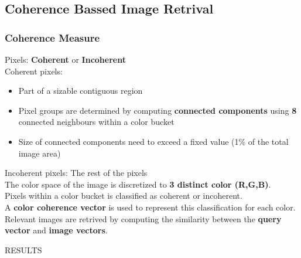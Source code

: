 \documentclass[9pt]{beamer}
\begin{document}
\subsection{Coherence Bassed Image Retrival}
\begin{frame}
\frametitle{Coherence Measure}
Pixels: \textbf{Coherent} or \textbf{Incoherent}\\[\baselineskip]
\pause
Coherent pixels:\\
\pause
\begin{itemize}[label=$\star$]
\item Part of a sizable contiguous region
\pause
\item Pixel groups are determined by computing \textbf{connected components} using \textbf{8} connected neighbours within a color bucket
\pause
\item Size of connected components need to exceed a fixed value (1\% of the total image area)\\[\baselineskip]
\pause
\end{itemize}
Incoherent pixels: The rest of the pixels\\[\baselineskip]
\pause
The color space of the image is discretized to \textbf{3 distinct color (R,G,B)}.\\[\baselineskip]
\pause
Pixels within a color bucket is classified as coherent or incoherent.\\[\baselineskip]
\pause
A \textbf{color coherence vector} is used to represent this classification for each color.\\[\baselineskip]
\pause
Relevant images are retrived by computing the similarity between the \textbf{query vector} and \textbf{image vectors}.

\end{frame}

\begin{frame}
\fontsize{18pt}{30}\selectfont
\centering
RESULTS
\end{frame}
\end{document}
